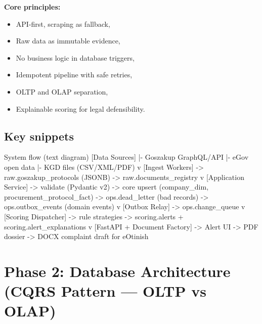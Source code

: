 \documentclass[11pt,a4paper]{article}
\begin{document}
\textbf{Core principles:}
\begin{itemize}[leftmargin=1.4em]
  \item API-first, scraping as fallback,
  \item Raw data as immutable evidence,
  \item No business logic in database triggers,
  \item Idempotent pipeline with safe retries,
  \item OLTP and OLAP separation,
  \item Explainable scoring for legal defensibility.
\end{itemize}

\subsection{Key snippets}
\begin{codeblock}[language={}]{System flow (text diagram)}
[Data Sources]
  |- Goszakup GraphQL/API
  |- eGov open data
  |- KGD files (CSV/XML/PDF)
  v
[Ingest Workers]
  -> raw.goszakup_protocols (JSONB)
  -> raw.documents_registry
  v
[Application Service]
  -> validate (Pydantic v2)
  -> core upsert (company_dim, procurement_protocol_fact)
  -> ops.dead_letter (bad records)
  -> ops.outbox_events (domain events)
  v
[Outbox Relay]
  -> ops.change_queue
  v
[Scoring Dispatcher]
  -> rule strategies
  -> scoring.alerts + scoring.alert_explanations
  v
[FastAPI + Document Factory]
  -> Alert UI
  -> PDF dossier
  -> DOCX complaint draft for eOtinish
\end{codeblock}

\section{Phase 2: Database Architecture (CQRS Pattern --- OLTP vs OLAP)}
\end{document}
